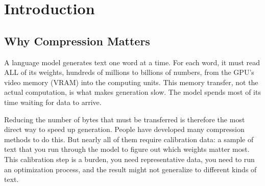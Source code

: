 \documentclass[11pt]{article}
\begin{document}
\begin{abstract}
\noindent
This paper asks a simple question: can you make a language model faster by
throwing away part of it, without any training data or fine-tuning, just by
looking at the numbers already inside the model? The answer is yes, at a
specific compression level, the model actually runs faster than the original.

We tested this on a laptop gaming GPU. We took a standard 8-billion-parameter
model and compressed its attention mechanism (the part that figures out which
words relate to which) by keeping only the most important directions in the
weight matrices. At 1,024 dimensions kept, throughput reached 106.3\% of the
uncompressed speed. At 1,536 dimensions, throughput was indistinguishable from
the original while losing some quality. The speedup comes from two physical
effects: compressed data fits better in the GPU's fastest memory (L2 cache),
and fewer separate computation steps are needed. We document which part of the
gain comes from which mechanism, list the limitations honestly, and provide
everything needed to reproduce the result.
\end{abstract}

\section{Introduction}
\label{sec:intro}

\subsection{Why Compression Matters}

A language model generates text one word at a time. For each word, it must
read ALL of its weights, hundreds of millions to billions of numbers, from
the GPU's video memory (VRAM) into the computing units. This memory transfer,
not the actual computation, is what makes generation slow. The model spends
most of its time waiting for data to arrive.

Reducing the number of bytes that must be transferred is therefore the most
direct way to speed up generation. People have developed many compression
methods to do this. But nearly all of them require calibration data: a sample
of text that you run through the model to figure out which weights matter most.
This calibration step is a burden, you need representative data, you need to
run an optimization process, and the result might not generalize to different
kinds of text.
\end{document}
